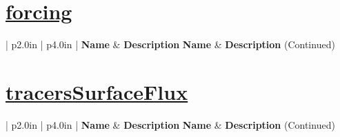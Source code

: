 \section[forcing]{\hyperref[sec:var_sec_forcing]{forcing}}
\label{sec:var_tab_forcing}

\vspace{0.5in}
{\small
\begin{center}
\begin{longtable}{| p{2.0in} | p{4.0in} |}
    \hline
    {\bf Name} & {\bf Description} \endfirsthead
    \hline 
    {\bf Name} & {\bf Description} (Continued) \endhead
    \hline
\end{longtable}
\end{center}
}
\section[tracersSurfaceFlux]{\hyperref[sec:var_sec_tracersSurfaceFlux]{tracersSurfaceFlux}}
\label{sec:var_tab_tracersSurfaceFlux}
\vspace{0.5in}
{\small
\begin{center}
\begin{longtable}{| p{2.0in} | p{4.0in} |}
    \hline
    {\bf Name} & {\bf Description} \endfirsthead
    \hline 
    {\bf Name} & {\bf Description} (Continued) \endhead
    \hline
\end{longtable}
\end{center}
}
